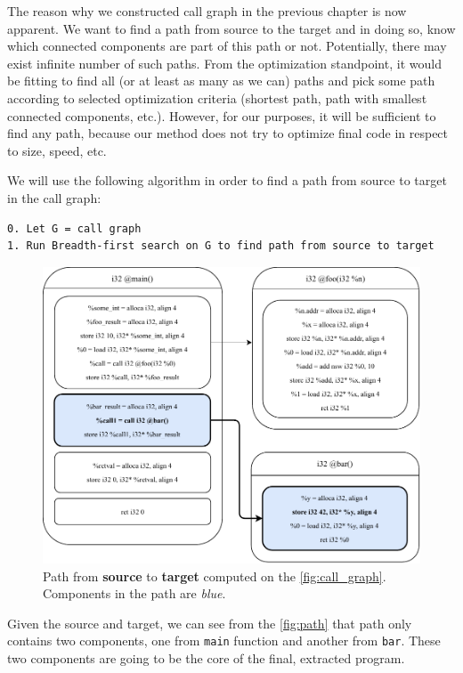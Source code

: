 \documentclass[12pt, twoside]{fithesis2}
\renewcommand{\_}{\leavevmode \kern0.07em\vbox{\hrule width0.4em}}
\begin{document}

The reason why we constructed call graph in the previous chapter is now apparent.
We want to find a path from source to the target and in doing so, know which
connected components are part of this path or not.
Potentially, there may exist infinite number of such paths. From
the optimization standpoint, it would be fitting to find all (or at least as
many as we can) paths and pick some path according to selected optimization
criteria (shortest path, path with smallest connected components, etc.).
However, for our purposes, it will be sufficient to find any path, because
our method does not try to optimize final code in respect to size, speed, etc.

We will use the following algorithm in order to find a path from source to target
in the call graph:

\begin{verbatim}
0. Let G = call graph
1. Run Breadth-first search on G to find path from source to target
\end{verbatim}

\begin{figure}[ht]
    \centering
    \includegraphics[]{images/main_path.pdf}
    \caption{Path from \textbf{source} to \textbf{target} computed on the
    \autoref{fig:call_graph}. Components in the path are \emph{blue}.
    }
    \label{fig:path}
\end{figure}

Given the source and target, we can see from the \autoref{fig:path} that path
only contains two components, one from \texttt{main} function and
another from \texttt{bar}. These two components are going to be the
core of the final, extracted program.
\end{document}
